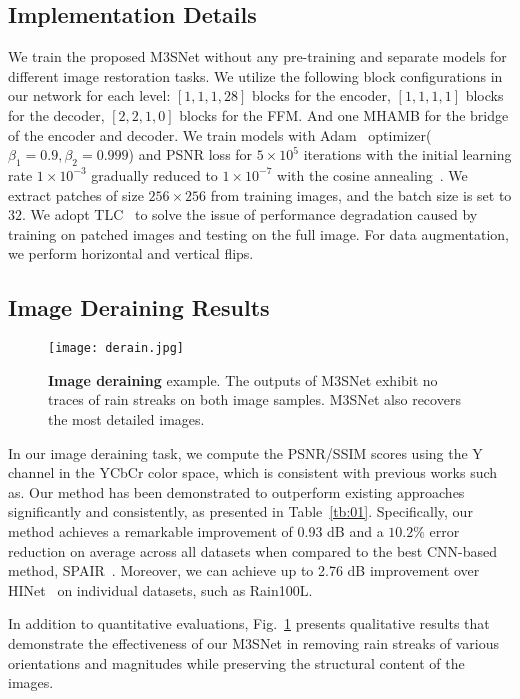 \documentclass[sn-mathphys,Numbered]{sn-jnl}
\theoremstyle{thmstyleone}\newtheorem{theorem}{Theorem}\newtheorem{proposition}[theorem]{Proposition}
\theoremstyle{thmstyletwo}\newtheorem{example}{Example}\newtheorem{remark}{Remark}
\theoremstyle{thmstylethree}\newtheorem{definition}{Definition}
\begin{document}
\subsection{Implementation Details}
We train the proposed M3SNet without any pre-training and separate models for different image restoration tasks. We utilize the following block configurations in our network for each level: $[1,1,1,28]$ blocks for the encoder, $[1,1,1,1]$ blocks for the decoder, $[2,2,1,0]$ blocks for the FFM. And one MHAMB for the bridge of the encoder and decoder. 
We train models with Adam~\cite{2014Adam} optimizer($\beta_1=0.9, \beta_2=0.999$) and PSNR loss for $5 \times 10^5$ iterations with the initial learning rate $1 \times 10^{-3}$ gradually reduced to $1 \times 10^{-7}$  with the cosine annealing~\cite{2016SGDR}. We extract patches of size $256 \times 256$ from training images, and the batch size is set to $32$. We adopt TLC~\cite{Chu2021ImprovingIR} to solve the issue of performance degradation caused by training on patched images and testing on the full image. For data augmentation, we perform horizontal and vertical flips. 

\subsection{Image Deraining Results}
\begin{figure} \centerline{\texttt{[image: derain.jpg]}}
	\caption{\textbf{Image deraining} example. The outputs of M3SNet exhibit
no traces of rain streaks on both image samples. M3SNet also recovers the most detailed images.}
	\label{fig:06}
\end{figure}
In our image deraining task, we compute the PSNR/SSIM scores using the Y channel in the YCbCr color space, which is consistent with previous works such as\cite{Zamir2021MPRNet,MSPFN,SPAIR}. Our method has been demonstrated to outperform existing approaches significantly and consistently, as presented in Table~\ref{tb:01}. Specifically, our method achieves a remarkable improvement of 0.93 dB and a $10.2\%$ error reduction on average across all datasets when compared to the best CNN-based method, SPAIR~\cite{SPAIR}. Moreover, we can achieve up to 2.76 dB improvement over HINet~\cite{Chen_2021_CVPR} on individual datasets, such as Rain100L.

In addition to quantitative evaluations, Fig.~\ref{fig:06} presents qualitative results that demonstrate the effectiveness of our M3SNet in removing rain streaks of various orientations and magnitudes while preserving the structural content of the images.
\end{document}
